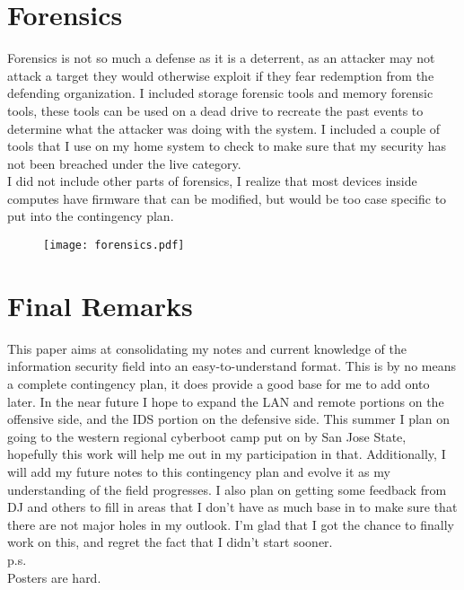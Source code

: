 \documentclass{article}
\begin{document}
\section{Forensics}
Forensics is not so much a defense as it is a deterrent, as an attacker may not attack a target they would otherwise exploit if they fear redemption from the defending organization. I included storage forensic tools and memory forensic tools, these tools can be used on a dead drive to recreate the past events to determine what the attacker was doing with the system. I included a couple of tools that I use on my home system to check to make sure that my security has not been breached under the live category.\\
I did not include other parts of forensics, I realize that most devices inside computes have firmware that can be modified, but would be too case specific to put into the contingency plan.\\
\begin{figure}[ht]
\centering
\texttt{[image: forensics.pdf]}
\end{figure}
\pagebreak

\section{Final Remarks}

This paper aims at consolidating my notes and current knowledge of the information security field into an easy-to-understand format. This is by no means a complete contingency plan, it does provide a good base for me to add onto later. In the near future I hope to expand the LAN and remote portions on the offensive side, and the IDS portion on the defensive side. This summer I plan on going to the western regional cyberboot camp put on by San Jose State, hopefully this work will help me out in my participation in that. Additionally, I will add my future notes to this contingency plan and evolve it as my understanding of the field progresses. I also plan on getting some feedback from DJ and others to fill in areas that I don't have as much base in to make sure that there are not major holes in my outlook. I'm glad that I got the chance to finally work on this, and regret the fact that I didn't start sooner.\\
p.s.\\
Posters are hard.\\
\end{document}
